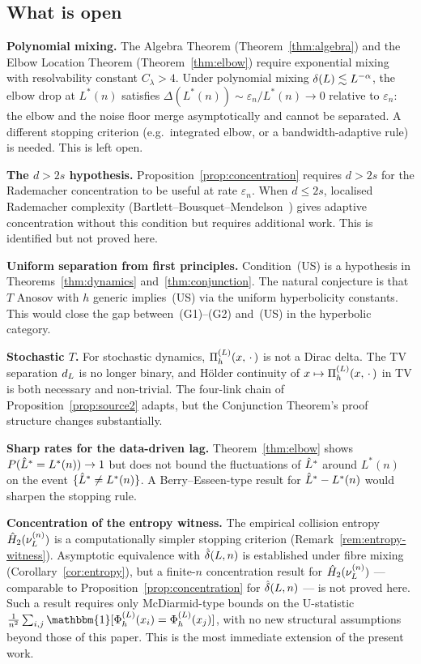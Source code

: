 \subsection{What is open}

\textbf{Polynomial mixing.}
The Algebra Theorem (Theorem~\ref{thm:algebra}) and the Elbow Location Theorem
(Theorem~\ref{thm:elbow}) require exponential mixing with resolvability constant
$C_\lambda > 4$.
Under polynomial mixing $\delta(L) \lesssim L^{-\alpha}$, the elbow drop at
$L^*(n)$ satisfies $\Delta(L^*(n)) \sim \varepsilon_n / L^*(n) \to 0$ relative
to $\varepsilon_n$: the elbow and the noise floor merge asymptotically and
cannot be separated.
A different stopping criterion (e.g.\ integrated elbow, or a bandwidth-adaptive
rule) is needed.
This is left open.

\textbf{The $d > 2s$ hypothesis.}
Proposition~\ref{prop:concentration} requires $d > 2s$ for the Rademacher
concentration to be useful at rate $\varepsilon_n$.
When $d \leq 2s$, localised Rademacher complexity
(Bartlett--Bousquet--Mendelson~\cite{BartlettBousquetMendelson2005})
gives adaptive concentration without this condition but requires additional
work.
This is identified but not proved here.

\textbf{Uniform separation from first principles.}
Condition~(US) is a hypothesis in Theorems~\ref{thm:dynamics}
and~\ref{thm:conjunction}.
The natural conjecture is that $T$ Anosov with $h$ generic implies~(US) via
the uniform hyperbolicity constants.
This would close the gap between~(G1)--(G2) and~(US) in the hyperbolic category.

\textbf{Stochastic $T$.}
For stochastic dynamics, $\Pi_h^{(L)}(x,\,\cdot\,)$ is not a Dirac delta.
The TV separation $d_{L}$ is no longer binary, and Hölder continuity
of $x \mapsto \Pi_h^{(L)}(x,\,\cdot\,)$ in TV is both necessary and non-trivial.
The four-link chain of Proposition~\ref{prop:source2} adapts, but the
Conjunction Theorem's proof structure changes substantially.

\textbf{Sharp rates for the data-driven lag.}
Theorem~\ref{thm:elbow} shows $P(\hat{L}^* = L^*(n)) \to 1$ but does not bound
the fluctuations of $\hat{L}^*$ around $L^*(n)$ on the event $\{\hat{L}^* \neq L^*(n)\}$.
A Berry--Esseen-type result for $\hat{L}^* - L^*(n)$ would sharpen the stopping rule.

\textbf{Concentration of the entropy witness.}
The empirical collision entropy $\hat{H}_2(\nu_L^{(n)})$ is a computationally
simpler stopping criterion (Remark~\ref{rem:entropy-witness}).
Asymptotic equivalence with $\hat{\delta}(L,n)$ is established under fibre mixing
(Corollary~\ref{cor:entropy}), but a finite-$n$ concentration result for
$\hat{H}_2(\nu_L^{(n)})$ --- comparable to Proposition~\ref{prop:concentration}
for $\hat{\delta}(L,n)$ --- is not proved here.
Such a result requires only McDiarmid-type bounds on the U-statistic
$\frac{1}{n^2}\sum_{i,j} \mathbbm{1}[\PhiL(x_i) = \PhiL(x_j)]$, with no
new structural assumptions beyond those of this paper.
This is the most immediate extension of the present work.

